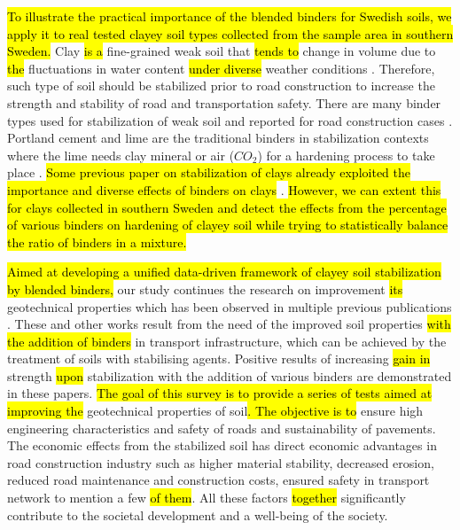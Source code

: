 \documentclass[constrmater,article,submit,pdftex,moreauthors]{Definitions/mdpi}
\begin{document}
\hl{To illustrate the practical importance of the blended binders for Swedish soils, we apply it to real tested clayey soil types collected from the sample area in southern Sweden. }Clay\hl{ is a }fine-grained weak soil that \hl{tends to }change in volume due to \hl{the }fluctuations in water content \hl{under diverse }weather conditions \cite{Sudhakar}. Therefore, such type\hl{ }of soil should be stabilized prior to road construction to increase the strength and stability of road and transportation safety. There are many binder types used for stabilization of weak soil and reported for road construction cases \citep{Antunes,Park}. Portland cement and lime are the traditional binders in stabilization contexts where the lime needs clay mineral or air ($CO_2$) for a hardening process to take place \citep{Bell,Hilt,LindhLemenkovaCEE,Taylor}. \hl{Some previous paper on stabilization of clays already exploited the importance and diverse effects of binders on clays} \cite{Okagbue,Estabragh,Xu}. \hl{However, we can extent this for clays collected in southern Sweden and detect the effects from the percentage of various binders on hardening of clayey soil while trying to statistically balance the ratio of binders in a mixture.}

\hl{Aimed at developing a unified data-driven framework of clayey soil stabilization by blended binders, }our study continues the research on improvement \hl{its} geotechnical properties\hl{ }which has been observed in multiple previous publications \citep{Sorengard,AlSwaidani,Feng,LindhLemenkovaECES,Maheepala,Lindh2022NL,Nordmark}. These and other works result from the need of the improved soil properties\hl{ with the addition of binders }in transport infrastructure, which can be achieved by the treatment of soils with stabilising agents. Positive results of increasing \hl{gain in }strength \hl{upon} stabilization\hl{ }with the addition of various binders are demonstrated in these papers. \hl{The goal of this survey is to provide a series of tests aimed at improving the }geotechnical properties of soil\hl{. The objective is to }ensure high engineering characteristics and safety of roads and sustainability of pavements. The economic effects from the stabilized soil has direct economic advantages in road construction industry such as higher material stability, decreased erosion, reduced road maintenance and construction costs, ensured safety in transport network to mention a few \hl{of them}. All these factors \hl{together} significantly contribute to the societal development and a well-being of the society.
\end{document}
